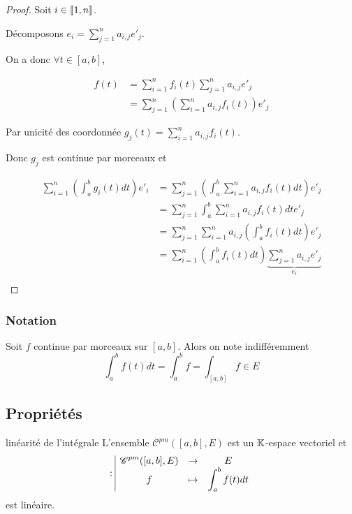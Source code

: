 
\begin{proof}
    Soit $i \in [\![1, n]\!]$. 

    Décomposons $e_i = \displaystyle \sum_{j=1}^n a_{i,j} e'_j$.

    On a donc $\forall t \in [a, b]$, 

    \begin{align*}
        f(t) & = \sum_{i=1}^n f_i(t) \sum_{j=1}^n a_{i,j} e'_j \\
        & = \sum_{j=1}^n \left( \sum_{i=1}^n a_{i,j} f_i(t) \right) e'_j
    \end{align*}

    Par unicité des coordonnée $\displaystyle g_j(t) = \sum_{i=1}^n a_{i,j} f_i(t)$.

    Donc $g_j$ est continue par morceaux et 

    \begin{align*}
        \sum_{i=1}^n \left( \int_a^b g_i(t) dt \right) e'_i & = \sum_{j=1}^n \left( \int_a^b \sum_{i=1}^n a_{i,j} f_i(t) dt \right) e'_j \\
            & = \sum_{j=1}^n \int_a^b \sum_{i=1}^n a_{i,j} f_i(t) dt e'_j \\
            & = \sum_{j=1}^n \sum_{i=1}^n a_{i,j} \left( \int_a^b f_i(t) dt \right) e'_j \\
            & = \sum_{i=1}^n \left( \int_a^b f_i(t) dt \right) \underbrace{\sum_{j=1}^n a_{i,j} e'_j}_{e_i} \\ 
    \end{align*}
\end{proof}

\subsubsection{Notation }

Soit $f$ continue par morceaux sur $[a, b]$. Alors on note indifféremment
$$\int_a^b f(t) dt = \int_a^b f = \int_{[a, b]} f \in E$$

\subsection{Propriétés }


\begin{proposition}{linéarité de l'intégrale }{}
    L'ensemble $\mathscr C^{pm}([a, b], E)$ est un $\mathbb{K}$-espace vectoriel et 
    $$ : \space \begin{array}{|ccc} \displaystyle \mathscr C^{pm}([a, b], E) & \to & \displaystyle E \\ \displaystyle f & \mapsto & \displaystyle \int_a^b f(t) dt \end{array}$$ 
    est linéaire. 
\end{proposition}

